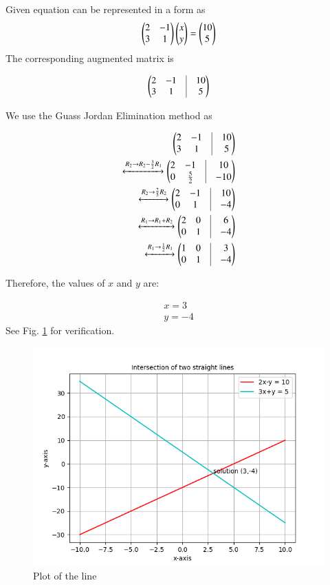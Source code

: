 
Given equation can be represented in a form as
\begin{equation}
\begin{pmatrix}2 & -1 \\ 3 & 1\end{pmatrix}\begin{pmatrix}x \\ y\end{pmatrix} = \begin{pmatrix}10 \\ 5\end{pmatrix}
\end{equation}
The corresponding augmented matrix is 

\begin{align}
		\myvec{
		2 & -1 & \vrule & 10 \\
		3 & 1 & \vrule & 5 \\
	}
\end{align}

We use the Guass Jordan Elimination method as

\begin{align}
	\myvec{
		2 & -1 & \vrule & 10 \\
		3 & 1 & \vrule & 5 \\
	}
	\\
	\xleftrightarrow[]{R_2 \rightarrow R_2 - \frac{3}{2}R_1}
	\myvec{
		2 & -1 & \vrule & 10 \\
		0 & \frac{5}{2} & \vrule & -10 \\
	}
	\\
	\xleftrightarrow[]{R_2\rightarrow \frac{2}{5}R_2}
	\myvec{
		2 & -1 & \vrule & 10 \\
		0 & 1 & \vrule & -4 \\
	}
	\\
	\xleftrightarrow[]{R_1 \rightarrow R_1 + R_2}
	\myvec{
		2 & 0 & \vrule & 6 \\
		0 & 1 & \vrule & -4 \\
	}
	\\
	\xleftrightarrow[]{R_1 \rightarrow \frac{1}{2}R_1}
	\myvec{
		1 & 0 & \vrule & 3 \\
		0 & 1 & \vrule & -4 \\
	}
\end{align}

Therefore, the values of $x$ and $y$ are:

\begin{align}
	x = 3 \\
	y = -4
\end{align}
See Fig. \ref{aug/2/11/plt} for verification.
\begin{figure}[!h]
\centering
\includegraphics[width=\columnwidth]{solutions/aug/2/11/Figures/plot.png}
\caption{Plot of the line}
\label{aug/2/11/plt}
\end{figure}
